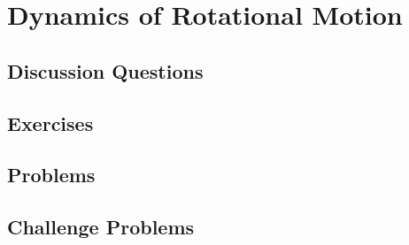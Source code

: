 
\chapter{Dynamics of Rotational Motion}

\section{Discussion Questions}

\section{Exercises}

\section{Problems}

\section{Challenge Problems}
